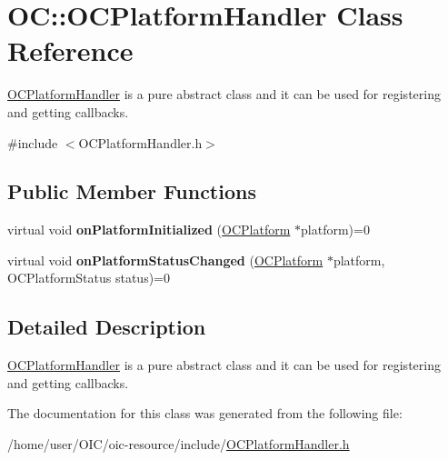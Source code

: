 \hypertarget{classOC_1_1OCPlatformHandler}{}\section{O\+C\+:\+:O\+C\+Platform\+Handler Class Reference}
\label{classOC_1_1OCPlatformHandler}


\hyperlink{classOC_1_1OCPlatformHandler}{O\+C\+Platform\+Handler} is a pure abstract class and it can be used for registering and getting callbacks.  




{\ttfamily \#include $<$O\+C\+Platform\+Handler.\+h$>$}

\subsection*{Public Member Functions}
\begin{DoxyCompactItemize}
\item 
\hypertarget{classOC_1_1OCPlatformHandler_af795fcf7ee80154d61ba9ad4ad1a6650}{}virtual void {\bfseries on\+Platform\+Initialized} (\hyperlink{classOC_1_1OCPlatform}{O\+C\+Platform} $\ast$platform)=0\label{classOC_1_1OCPlatformHandler_af795fcf7ee80154d61ba9ad4ad1a6650}

\item 
\hypertarget{classOC_1_1OCPlatformHandler_a699a85a7ee54fd9ee2b5c45828be4392}{}virtual void {\bfseries on\+Platform\+Status\+Changed} (\hyperlink{classOC_1_1OCPlatform}{O\+C\+Platform} $\ast$platform, O\+C\+Platform\+Status status)=0\label{classOC_1_1OCPlatformHandler_a699a85a7ee54fd9ee2b5c45828be4392}

\end{DoxyCompactItemize}


\subsection{Detailed Description}
\hyperlink{classOC_1_1OCPlatformHandler}{O\+C\+Platform\+Handler} is a pure abstract class and it can be used for registering and getting callbacks. 

The documentation for this class was generated from the following file\+:\begin{DoxyCompactItemize}
\item 
/home/user/\+O\+I\+C/oic-\/resource/include/\hyperlink{OCPlatformHandler_8h}{O\+C\+Platform\+Handler.\+h}\end{DoxyCompactItemize}
